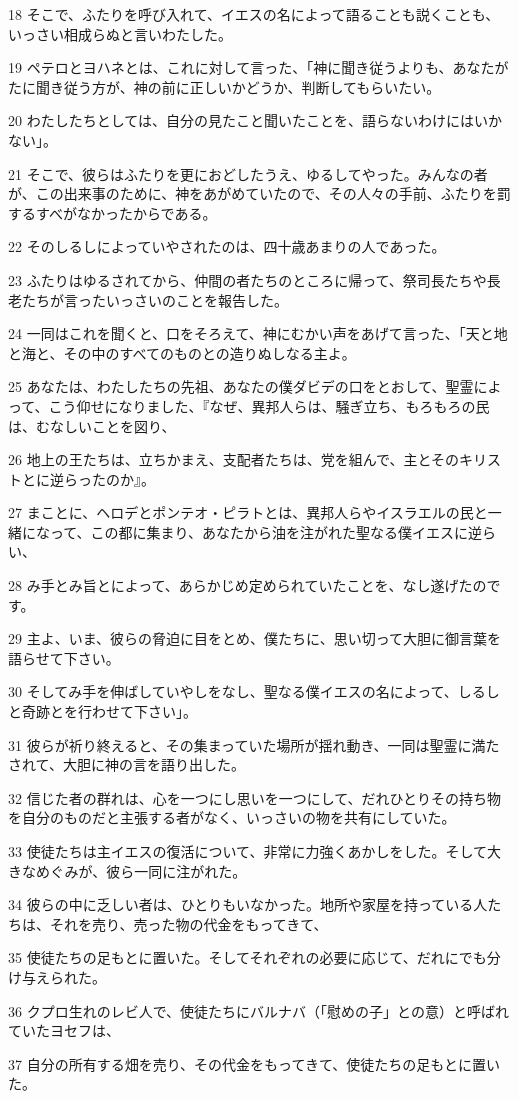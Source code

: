 \par 18 そこで、ふたりを呼び入れて、イエスの名によって語ることも説くことも、いっさい相成らぬと言いわたした。
\par 19 ペテロとヨハネとは、これに対して言った、「神に聞き従うよりも、あなたがたに聞き従う方が、神の前に正しいかどうか、判断してもらいたい。
\par 20 わたしたちとしては、自分の見たこと聞いたことを、語らないわけにはいかない」。
\par 21 そこで、彼らはふたりを更におどしたうえ、ゆるしてやった。みんなの者が、この出来事のために、神をあがめていたので、その人々の手前、ふたりを罰するすべがなかったからである。
\par 22 そのしるしによっていやされたのは、四十歳あまりの人であった。
\par 23 ふたりはゆるされてから、仲間の者たちのところに帰って、祭司長たちや長老たちが言ったいっさいのことを報告した。
\par 24 一同はこれを聞くと、口をそろえて、神にむかい声をあげて言った、「天と地と海と、その中のすべてのものとの造りぬしなる主よ。
\par 25 あなたは、わたしたちの先祖、あなたの僕ダビデの口をとおして、聖霊によって、こう仰せになりました、『なぜ、異邦人らは、騒ぎ立ち、もろもろの民は、むなしいことを図り、
\par 26 地上の王たちは、立ちかまえ、支配者たちは、党を組んで、主とそのキリストとに逆らったのか』。
\par 27 まことに、ヘロデとポンテオ・ピラトとは、異邦人らやイスラエルの民と一緒になって、この都に集まり、あなたから油を注がれた聖なる僕イエスに逆らい、
\par 28 み手とみ旨とによって、あらかじめ定められていたことを、なし遂げたのです。
\par 29 主よ、いま、彼らの脅迫に目をとめ、僕たちに、思い切って大胆に御言葉を語らせて下さい。
\par 30 そしてみ手を伸ばしていやしをなし、聖なる僕イエスの名によって、しるしと奇跡とを行わせて下さい」。
\par 31 彼らが祈り終えると、その集まっていた場所が揺れ動き、一同は聖霊に満たされて、大胆に神の言を語り出した。
\par 32 信じた者の群れは、心を一つにし思いを一つにして、だれひとりその持ち物を自分のものだと主張する者がなく、いっさいの物を共有にしていた。
\par 33 使徒たちは主イエスの復活について、非常に力強くあかしをした。そして大きなめぐみが、彼ら一同に注がれた。
\par 34 彼らの中に乏しい者は、ひとりもいなかった。地所や家屋を持っている人たちは、それを売り、売った物の代金をもってきて、
\par 35 使徒たちの足もとに置いた。そしてそれぞれの必要に応じて、だれにでも分け与えられた。
\par 36 クプロ生れのレビ人で、使徒たちにバルナバ（「慰めの子」との意）と呼ばれていたヨセフは、
\par 37 自分の所有する畑を売り、その代金をもってきて、使徒たちの足もとに置いた。

